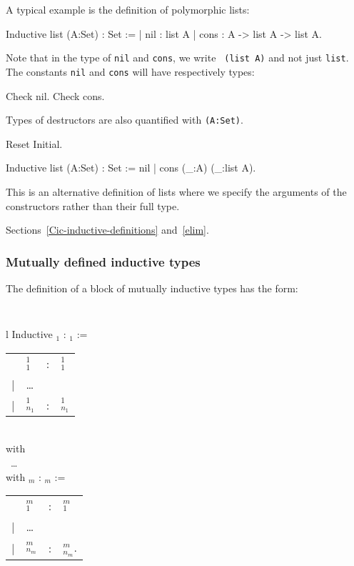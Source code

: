 A typical example is the definition of polymorphic lists:
\begin{coq_example*}
Inductive list (A:Set) : Set :=
  | nil : list A
  | cons : A -> list A -> list A.
\end{coq_example*}

Note that in the type of {\tt nil} and {\tt cons}, we write {\tt
  (list A)} and not just {\tt list}.\\ The constants {\tt nil} and
{\tt cons} will have respectively types:

\begin{coq_example}
Check nil.
Check cons.
\end{coq_example}

Types of destructors are also quantified with {\tt (A:Set)}.

\begin{coq_eval}
Reset Initial.
\end{coq_eval}
\begin{Variants}
\item
\begin{coq_example*}
Inductive list (A:Set) : Set := nil | cons (_:A) (_:list A).
\end{coq_example*}
This is an alternative definition of lists where we specify the
arguments of the constructors rather than their full type.
\end{Variants}

\begin{ErrMsgs}
\item {}
\end{ErrMsgs}

\SeeAlso Sections~\ref{Cic-inductive-definitions} and~\ref{elim}.


\subsubsection{Mutually defined inductive types
\label{Mutual-Inductive}}

The definition of a block of mutually inductive types has the form:

\medskip
{\tt 
\begin{tabular}{l}
Inductive {\ident$_1$} : {\type$_1$} :=  \\
\begin{tabular}{clcl}
   & {\ident$_1^1$}     &:& {\type$_1^1$} \\
 | & {\ldots} && \\
 | & {\ident$_{n_1}^1$} &:& {\type$_{n_1}^1$}
\end{tabular}  \\
with\\
~{\ldots} \\
with {\ident$_m$} : {\type$_m$} := \\
\begin{tabular}{clcl}
   & {\ident$_1^m$}     &:& {\type$_1^m$} \\
 | & {\ldots} \\
 | & {\ident$_{n_m}^m$} &:& {\type$_{n_m}^m$}.
\end{tabular}
\end{tabular}
}
\medskip

